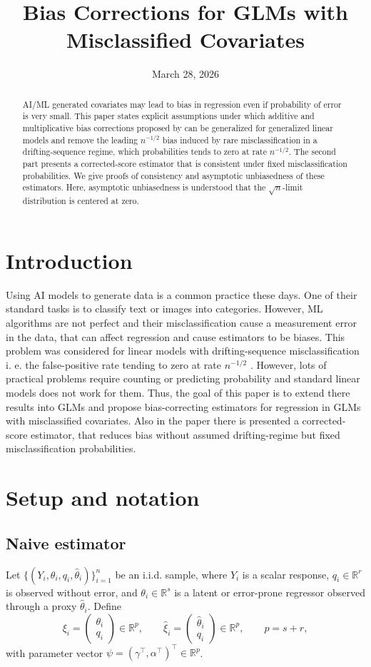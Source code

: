\documentclass[11pt]{article}
\title{\bf Bias Corrections for GLMs with Misclassified Covariates}
\author{}
\date{\vspace{-1.25em}March 28, 2026}
\theoremstyle{definition}
\theoremstyle{remark}
\newcommand{\R}{\mathbb{R}}
\begin{document}
\maketitle

\begin{abstract}
AI/ML generated covariates may lead to bias in regression even if probability of error is very small. This paper states explicit assumptions under which additive and multiplicative bias corrections proposed by \citep{battaglia2025} can be generalized for generalized linear models and remove the leading $n^{-1/2}$ bias induced by rare misclassification in a drifting-sequence regime, which probabilities tends to zero at rate $n^{-1/2}$. The second part presents a corrected-score estimator that is consistent under fixed misclassification probabilities. We give proofs of consistency and asymptotic unbiasedness of these estimators. Here, asymptotic unbiasedness is understood that the $\sqrt{n}$-limit distribution is centered at zero.
\end{abstract}

\section{Introduction}
Using AI models to generate data is a common practice these days. One of their standard tasks is to classify text or images into categories. However, ML algorithms are not perfect and their misclassification cause a measurement error in the data, that can affect regression and cause estimators to be biases. This problem was considered for linear models with drifting-sequence misclassification i. e. the false-positive rate tending to zero at rate $n^{-1/2}$ \citep{battaglia2025}. However, lots of practical problems require counting or predicting probability and standard linear models does not work for them. Thus, the goal of this paper is to extend there results into GLMs and propose bias-correcting estimators for regression in GLMs with misclassified covariates. Also in the paper there is presented a corrected-score estimator, that reduces bias without assumed drifting-regime but fixed misclassification probabilities.

\section{Setup and notation}
\subsection{Naive estimator}
Let $\{(Y_i,\theta_i,q_i,\hat\theta_i)\}_{i=1}^n$ be an i.i.d. sample, where $Y_i$ is a scalar response, $q_i\in\R^r$ is observed without error, and $\theta_i\in\R^s$ is a latent or error-prone regressor observed through a proxy $\hat\theta_i$. Define
\[
\xi_i = \begin{pmatrix}\theta_i\\ q_i\end{pmatrix}\in\R^p,\qquad \hat\xi_i=\begin{pmatrix}\hat\theta_i\\ q_i\end{pmatrix}\in\R^p,\qquad p=s+r,
\]
with parameter vector $\psi=(\gamma^\top,\alpha^\top)^\top\in\R^p$.
\end{document}
